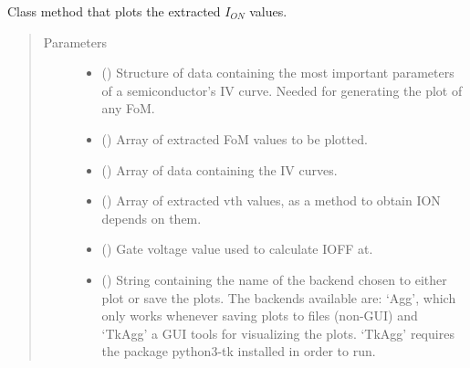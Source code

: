 \documentclass[letterpaper,10pt,english,openany, oneside]{sphinxmanual}
\begin{document}
\begin{fulllineitems}

\begin{fulllineitems}
\label{\detokenize{index:fompy.fom.ion_ext.plot}}
Class method that plots the extracted \(I_{ON}\) values.
\begin{quote}\begin{description}
\item[{Parameters}] \leavevmode\begin{itemize}
\item {} 
 () \textendash{} Structure of data containing the most important parameters of a semiconductor’s IV curve.
Needed for generating the plot of any FoM.

\item {} 
 () \textendash{} Array of extracted FoM values to be plotted.

\item {} 
 () \textendash{} Array of data containing the IV curves.

\item {} 
 () \textendash{} Array of extracted vth values, as a method to obtain ION depends on them.

\item {} 
 () \textendash{} Gate voltage value used to calculate IOFF at.

\item {} 
 () \textendash{} String containing the name of the backend chosen to either plot or save the plots. The backends available are:
‘Agg’, which only works whenever saving plots to files (non-GUI) and ‘TkAgg’ a GUI tools for visualizing the plots.
‘TkAgg’ requires the package python3-tk installed in order to run.


\end{itemize}
\end{description}
\end{quote}
\end{fulllineitems}
\end{fulllineitems}
\end{document}
